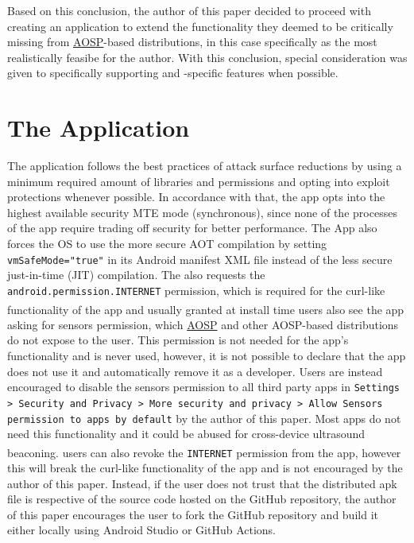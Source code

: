 \documentclass[a4paper,12pt]{report}
\begin{document}
Based on this conclusion, the author of this paper decided to proceed with creating an application to extend the functionality they deemed to be critically missing from \hyperref[aosp]{AOSP}-based distributions, in this case specifically \citeauthor{grapheneos} as the most realistically feasibe for the author. With this conclusion, special consideration was given to specifically supporting \citeauthor{grapheneos} and \citeauthor{grapheneos}-specific features when possible. 

\chapter{The Application}
The application follows the best practices of attack surface reductions by using a minimum required amount of libraries and permissions and opting into exploit protections whenever possible. In accordance with that, the app opts into the highest available security MTE mode (synchronous), since none of the processes of the app require trading off security for better performance. The App also forces the OS to use the more secure AOT compilation by setting \texttt{vmSafeMode="true"} in its Android manifest XML file instead of the less secure just-in-time (JIT) compilation. The also requests the \texttt{android.permission.INTERNET} permission, which is required for the curl-like functionality of the app and usually granted at install time\textsuperscript{\citep{install-time-perm}} \citeauthor{grapheneos} users also see the app asking for sensors permission, which \hyperref[aosp]{AOSP} and other AOSP-based distributions do not expose to the user. This permission is not needed for the app's functionality and is never used, however, it is not possible to declare that the app does not use it and automatically remove it as a developer. Users are instead encouraged to disable the sensors permission to all third party apps in \texttt{Settings > Security and Privacy > More security and privacy > Allow Sensors permission to apps by default} by the author of this paper. Most apps do not need this functionality and it could be abused for cross-device ultrasound beaconing.\textsuperscript{\citep{cross-device-tracking}} \citeauthor{grapheneos} users can also revoke the \texttt{INTERNET} permission from the app, however this will break the curl-like functionality of the app and is not encouraged by the author of this paper. Instead, if the user does not trust that the distributed apk file is respective of the source code hosted on the GitHub repository, the author of this paper encourages the user to fork the GitHub repository and build it either locally using Android Studio or GitHub Actions. 
\end{document}
